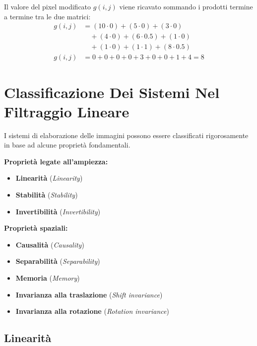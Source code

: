 ﻿\documentclass[11pt, a4paper]{article}
\begin{document}
Il valore del pixel modificato $g(i,j)$ viene ricavato sommando i prodotti termine a termine tra le due matrici:
\begin{align*}
g(i,j) &= (10 \cdot 0) + (5 \cdot 0) + (3 \cdot 0) \\
       &\quad + (4 \cdot 0) + (6 \cdot 0.5) + (1 \cdot 0) \\
       &\quad + (1 \cdot 0) + (1 \cdot 1) + (8 \cdot 0.5) \\
g(i,j) &= 0 + 0 + 0 + 0 + 3 + 0 + 0 + 1 + 4 = \boxed{8}
\end{align*}


\newpage

\section{Classificazione Dei Sistemi Nel Filtraggio Lineare}

I sistemi di elaborazione delle immagini possono essere classificati rigorosamente in base ad alcune proprietà fondamentali.

\textbf{Proprietà legate all'ampiezza:}
\begin{itemize}
    \item \textbf{Linearità} (\emph{Linearity})
    \item \textbf{Stabilità} (\emph{Stability})
    \item \textbf{Invertibilità} (\emph{Invertibility})
\end{itemize}

\textbf{Proprietà spaziali:}
\begin{itemize}
    \item \textbf{Causalità} (\emph{Causality})
    \item \textbf{Separabilità} (\emph{Separability})
    \item \textbf{Memoria} (\emph{Memory})
    \item \textbf{Invarianza alla traslazione} (\emph{Shift invariance})
    \item \textbf{Invarianza alla rotazione} (\emph{Rotation invariance})
\end{itemize}

\subsection{Linearità}
\end{document}
